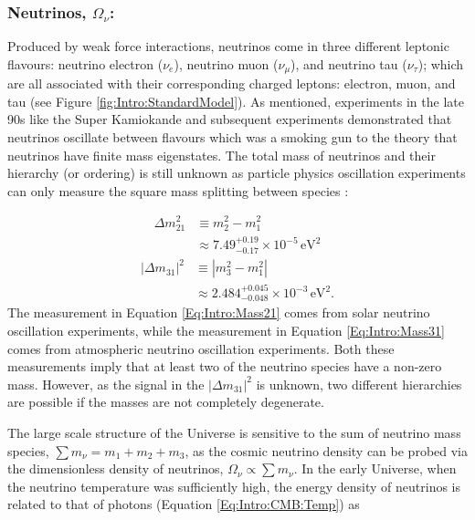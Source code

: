 \subsubsection{Neutrinos, $\Omega_{\nu}$:}
Produced by weak force interactions, neutrinos come in three different leptonic flavours: neutrino electron ($\nu_e$), neutrino muon ($\nu_{\mu}$), and neutrino tau ($\nu_{\tau}$); which are all associated with their corresponding charged leptons: electron, muon, and tau (see Figure \ref{fig:Intro:StandardModel}). As mentioned, experiments in the late 90s like the Super Kamiokande \citep{Kamiokande1998} and subsequent experiments \citep{2002SNO,2005KamLAND,2008MINOS,2012RENOExperiment,AbeNeutrino2014} demonstrated that neutrinos oscillate between flavours which was a smoking gun to the theory that neutrinos have finite mass eigenstates. The total mass of neutrinos and their hierarchy (or ordering) is still unknown as particle physics oscillation experiments can only measure the square mass splitting between species \citep{2014Gonzalez-GarciaNeutrino}:

\begin{align}
\Delta m_{21}^2 & \equiv m_2^2 - m_1^2 \nonumber \\ 
				& \approx 7.49^{+0.19}_{-0.17} \times 10^{-5}\, \text{eV}^2 \label{Eq:Intro:Mass21}
\end{align}
\begin{align}
|\Delta m_{31}|^2 & \equiv |m^2_3 - m_1^2| \nonumber \\ 
				  & \approx 2.484^{+0.045}_{-0.048} \times 10^{-3} \, \text{eV}^2. \label{Eq:Intro:Mass31}
\end{align}
The measurement in Equation \eqref{Eq:Intro:Mass21} comes from solar neutrino oscillation experiments, while the measurement in Equation \eqref{Eq:Intro:Mass31} comes from atmospheric neutrino oscillation experiments. Both these measurements imply that at least two of the neutrino species have a non-zero mass. However, as the signal in the $|\Delta m_{31}|^2$ is unknown, two different hierarchies are possible if the masses are not completely degenerate.

\qquad The large scale structure of the Universe is sensitive to the sum of neutrino mass species, $\sum m_{\nu} = m_1 + m_2 + m_3$, as the cosmic neutrino density can be probed via the dimensionless density of neutrinos, $\Omega_{\nu} \propto \sum m_{\nu}$. In the early Universe, when the neutrino temperature was sufficiently high, the energy density of neutrinos is related to that of photons (Equation \ref{Eq:Intro:CMB:Temp}) as %

